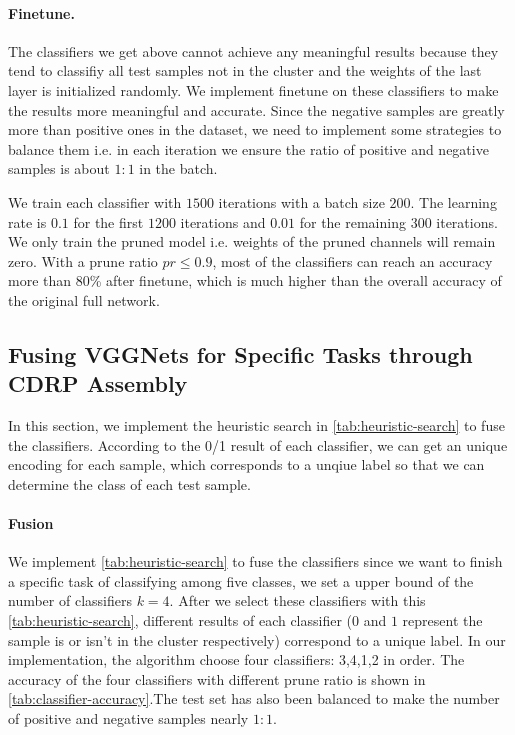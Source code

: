 \documentclass[sigplan,10pt,review]{acmart}\settopmatter{printfolios=true,printccs=false,printacmref=false}
\begin{document}
\paragraph{Finetune.} The classifiers we get above cannot achieve any meaningful results because they tend to classifiy all test samples not in the cluster and the weights of the last layer is initialized randomly.
We implement finetune on these classifiers to make the results more meaningful and accurate. 
Since the negative samples are greatly more than positive ones in the dataset, we need to implement some strategies to balance them i.e. in each iteration we ensure the ratio of positive and negative samples is about $1:1$ in the batch.

We train each classifier with $1500$ iterations with a batch size $200$. 
The learning rate is $0.1$ for the first $1200$ iterations and $0.01$ for the remaining $300$ iterations. 
We only train the pruned model i.e. weights of the pruned channels will remain zero.
With a prune ratio $pr\leq0.9$, most of the classifiers can reach an accuracy more than 80\% after finetune, which is much higher than the overall accuracy of the original full network.
 

 
\subsection{Fusing VGGNets for Specific Tasks through CDRP Assembly}
In this section, we implement the heuristic search in \cref{tab:heuristic-search} to fuse the classifiers. According to the 0/1 result of each classifier, we can get an unique encoding for each sample, which corresponds to a unqiue label so that we can determine the class of each test sample.

\paragraph{Fusion}We implement \cref{tab:heuristic-search} to fuse the classifiers since we want to finish a specific task of classifying among five classes, we set a upper bound of the number of classifiers $k=4$. 
After we select these classifiers with this \cref{tab:heuristic-search}, different results of each classifier ($0$ and $1$ represent the sample is or isn't in the cluster respectively) correspond to a unique label.
In our implementation, the algorithm choose four classifiers: 3,4,1,2 in order. 
The accuracy of the four classifiers with different prune ratio is shown in \cref{tab:classifier-accuracy}.The test set has also been balanced to make the number of positive and negative samples nearly $1:1$. 
\end{document}
